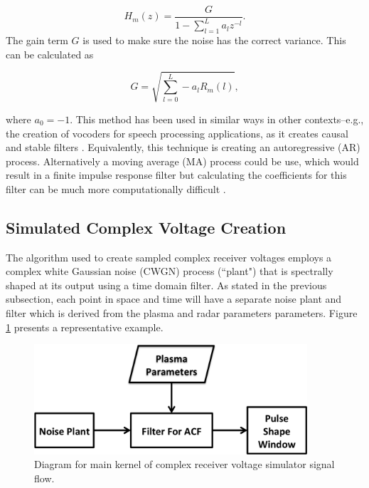 \documentclass[draft,ras]{agutex}
\begin{document}
\begin{article}
\begin{equation}
\label{eq:filtz}
H_m(z) = \frac{G}{1-\displaystyle \sum_{l=1}^{L} a_l z^{-l}}.
\end{equation}
\noindent The gain term $G$ is used to make sure the noise has the correct variance. This can be calculated as 

\begin{equation}
\label{eq:gainterm}
G=\sqrt{\displaystyle \sum_{l=0}^L -a_l R_m(l)},
\end{equation}

\noindent where $a_0=-1$. This method has been used in similar ways in other contexts--e.g., the creation of vocoders for speech processing applications, as it creates causal and stable filters \citep{rabinerdigitalspeech}. Equivalently, this technique is creating an autoregressive (AR) process. Alternatively a moving average (MA) process could be use, which would result in a finite impulse response filter but calculating the coefficients for this filter can be much more computationally difficult \citep{kayvol1}.

\subsection{Simulated Complex Voltage Creation}

The algorithm used to create sampled complex receiver voltages employs a complex white Gaussian noise (CWGN) process (``plant") that is spectrally shaped at its output using a time domain filter. As stated in the previous subsection, each point in space and time will have a separate noise plant and filter which is derived from the plasma and radar parameters parameters. Figure \ref{fig:IQdiagram} presents a representative example. 

\begin{figure}[h!]
\centering
\includegraphics[width=4in]{diagrampart}
\caption{Diagram for main kernel of complex receiver voltage simulator signal flow.}
\label{fig:IQdiagram}
\end{figure}


\end{article}
\end{document}
